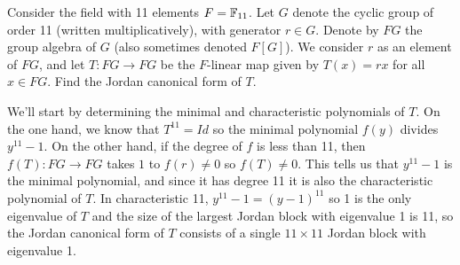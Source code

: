 %
\begin{question}[subtitle = January 2018 Problem 3,ID=Jan18_3]
Consider the field with 11 elements $F=\mathbb{F}_{11}$. Let $G$ denote the cyclic group of order 11 (written multiplicatively), with generator $r \in G$. Denote by $FG$ the group algebra of $G$ (also sometimes denoted $F[G]$). We consider $r$ as an element of $FG$, and let $T\colon FG \to FG$ be the $F$-linear map given by $T(x) = rx$ for all $x \in FG$. Find the Jordan canonical form of $T$.
\end{question}
\begin{solution}
We’ll start by determining the minimal and characteristic polynomials of $T$. On the one hand, we know that $T^{11} = Id$ so the minimal polynomial $f(y)$ divides $y^{11}-1$. On the other hand, if the degree of $f$ is less than 11, then $f(T): FG \to FG$ takes $1$ to $f(r) \neq 0$ so $f(T)\neq 0$. This tells us that $y^{11}-1$ is the minimal polynomial, and since it has degree 11 it is also the characteristic polynomial of $T$. In characteristic 11, $y^{11}-1 = (y-1)^{11}$ so 1 is the only eigenvalue of $T$ and the size of the largest Jordan block with eigenvalue 1 is 11, so the Jordan canonical form of $T$ consists of a single $11 \times 11$ Jordan block with eigenvalue 1.
\end{solution}


